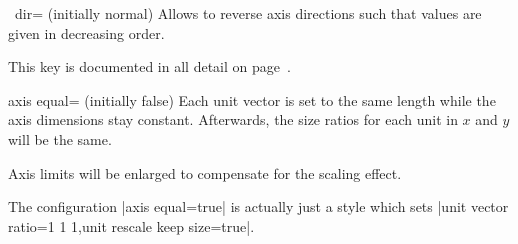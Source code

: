 {\def\pgfmanualpdflabel#1#2{}
\begin{pgfplotsxykey}{\x\ dir= (initially normal)}
	Allows to reverse axis directions such that values are given in decreasing order.

	This key is documented in all detail on page~\pageref{key:pgfplots:xydir}.
\end{pgfplotsxykey}
}

\begin{pgfplotskey}{axis equal= (initially false)}
	Each unit vector is set to the same length while the axis dimensions stay constant. Afterwards, the size ratios for each unit in $x$ and $y$ will be the same.
	
	Axis limits will be enlarged to compensate for the scaling effect.
\begin{codeexample}[]
\hspace{1cm}
\end{codeexample}
	
\begin{codeexample}[]
\hspace{1cm}
\end{codeexample}

	The configuration |axis equal=true| is actually just a style which sets |unit vector ratio=1 1 1,unit rescale keep size=true|.
\end{pgfplotskey}

